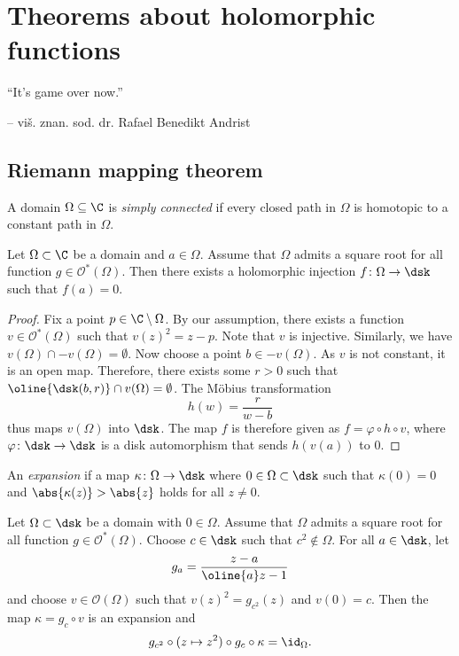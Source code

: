 \section{Theorems about holomorphic functions}

\epigraph{``It's game over now.''}{-- viš. znan. sod. dr. Rafael
Benedikt Andrist}

\subsection{Riemann mapping theorem}


\begin{definicija}
A domain $\Omega \subseteq \C$ is
\emph{simply connected} if every closed
path in $\Omega$ is homotopic to a constant path in $\Omega$.
\end{definicija}

\begin{lema}
\label{thm_hol:lm:inj_exis}
Let $\Omega \subset \C$ be a domain and $a \in \Omega$. Assume that
$\Omega$ admits a square root for all function
$g \in \mathcal{O}^*(\Omega)$. Then there exists a holomorphic
injection $f \colon \Omega \to \dsk$ such that $f(a) = 0$.
\end{lema}

\begin{proof}
Fix a point $p \in \C \setminus \Omega$. By our assumption, there
exists a function $v \in \mathcal{O}^*(\Omega)$ such that
$v(z)^2 = z-p$. Note that $v$ is injective. Similarly, we have
$v(\Omega) \cap -v(\Omega) = \emptyset$. Now choose a point
$b \in -v(\Omega)$. As $v$ is not constant, it is an open map.
Therefore, there exists some $r > 0 $ such that
$\oline{\dsk(b, r)} \cap v(\Omega) = \emptyset$. The Möbius
transformation
\[
h(w) = \frac{r}{w-b}
\]
thus maps $v(\Omega)$ into $\dsk$. The map $f$ is therefore given
as $f = \varphi \circ h \circ v$, where
$\varphi \colon \dsk \to \dsk$ is a disk automorphism that sends
$h(v(a))$ to $0$.
\end{proof}

\begin{definicija}
An \emph{expansion} if a map
$\kappa \colon \Omega \to \dsk$ where $0 \in \Omega \subset \dsk$
such that $\kappa(0) = 0$ and $\abs{\kappa(z)} > \abs{z}$ holds for
all $z \ne 0$.
\end{definicija}

\begin{lema}
Let $\Omega \subset \dsk$ be a domain with $0 \in \Omega$. Assume
that $\Omega$ admits a square root for all function
$g \in \mathcal{O}^*(\Omega)$. Choose $c \in \dsk$ such that
$c^2 \not \in \Omega$. For all $a \in \dsk$, let
\[
g_a = \frac{z - a}{\oline{a} z - 1}
\]
and choose $v \in \mathcal{O}(\Omega)$ such that
$v(z)^2 = g_{c^2}(z)$ and $v(0) = c$. Then the map
$\kappa = g_c \circ v$ is an expansion and
\[
g_{c^2} \circ (z \mapsto z^2) \circ g_c \circ \kappa =
\id_{\Omega}.
\]
\end{lema}


